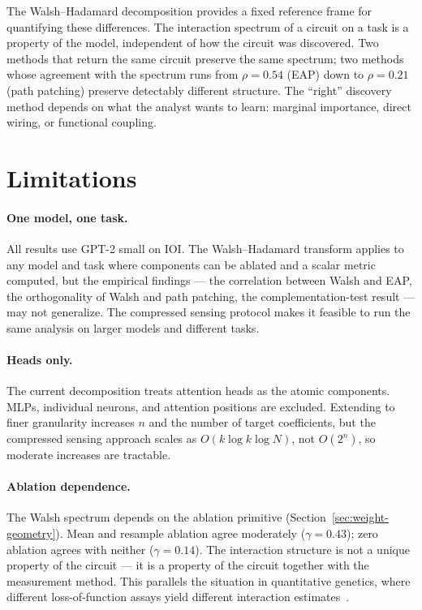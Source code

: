 \documentclass{article}
\begin{document}
The Walsh--Hadamard decomposition provides a fixed reference frame for
quantifying these differences. The interaction spectrum of a circuit on
a task is a property of the model, independent of how the circuit was
discovered. Two methods that return the same circuit preserve the same
spectrum; two methods whose agreement with the spectrum runs from $\rho = 0.54$ (EAP) down to $\rho = 0.21$ (path patching) preserve detectably different structure. The ``right'' discovery method depends on what
the analyst wants to learn: marginal importance, direct wiring, or
functional coupling.

\section{Limitations}
\label{sec:limitations}

\paragraph{One model, one task.}

All results use GPT-2 small on IOI. The Walsh--Hadamard transform
applies to any model and task where components can be ablated and a
scalar metric computed, but the empirical findings --- the correlation
between Walsh and EAP, the orthogonality of Walsh and path patching,
the complementation-test result --- may not generalize. The compressed
sensing protocol makes it feasible to run the same analysis on larger
models and different tasks.

\paragraph{Heads only.}

The current decomposition treats attention heads as the atomic
components. MLPs, individual neurons, and attention positions are
excluded. Extending to finer granularity increases $n$ and the number
of target coefficients, but the compressed sensing approach scales
as $O(k \log k \log N)$, not $O(2^n)$, so moderate increases are
tractable.

\paragraph{Ablation dependence.}

The Walsh spectrum depends on the ablation primitive
(Section~\ref{sec:weight-geometry}). Mean and resample ablation agree
moderately ($\gamma = 0.43$); zero ablation agrees with neither
($\gamma = 0.14$). The interaction structure is not a unique property
of the circuit --- it is a property of the circuit together with the
measurement method. This parallels the situation in quantitative
genetics, where different loss-of-function assays yield different
interaction
estimates~\citep{housden2017comparison,fluidity2024elife}.
\end{document}
